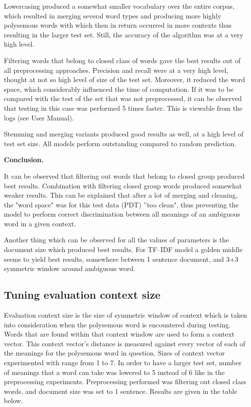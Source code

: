 Lowercasing produced a somewhat smaller vocabulary over the entire corpus, which resulted in merging 
several word types and producing more highly polysemous words with which then in return occurred in 
more contexts thus resulting in the larger test set. Still, the accuracy of the algorithm was at a very high 
level.

Filtering words that belong to closed class of words gave the best results out of all preprocessing 
approaches. Precision and recall were at a very high level, thought at not so high level of size of the test set. 
Moreover, it reduced the word space, which considerably influenced the time of computation. If it was to
be compared with the test of the set that was not preprocessed, it can be observed that testing in this 
case was performed 5 times faster. This is viewable from the logs (see User Manual).

Stemming and merging variants produced good results as well, at a high level of test set size. 
All models perform outstanding compared to random prediction. 

\vspace{10 mm}
\textbf{Conclusion.} 

It can be observed that filtering out words that belong to closed group produced 
best results. Combination with filtering closed group words produced somewhat weaker results. This can be explained that after a lot of merging and cleaning, the "word space" was for this test data (PDT) ''too clean", thus preventing the model to perform correct discrimination between all 
meanings of an ambiguous word in a given context.

Another thing which can be observed for all the values of parameters is the document size which 
produced best results. For TF--IDF model a golden middle seems to yield best results, somewhere 
between 1 sentence document, and 3+3 symmetric window around ambiguous word.


\subsection{Tuning evaluation context size}
Evaluation context size is the size of symmetric window of context which is taken into consideration 
when the polysemous word is encountered during testing. Words that are found within that context
window are used to form a context vector. This context vector's distance is measured against every
vector of each  of the meanings for the polysemous word in question. Sizes of context vector 
experimented with range from 1 to 7. In order to have a larger test set, number of meanings that 
a word can take was lowered to 5 instead of 6 like in the preprocessing experiments. Preprocessing
performed was filtering out closed class words, and document size was set to 1 sentence. 
Results are given 
in the table below. 

